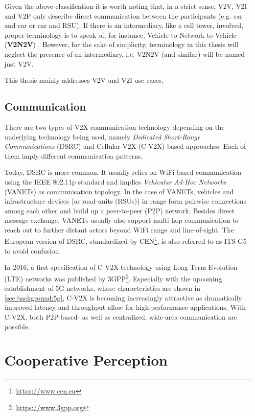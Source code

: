 Given the above classification it is worth noting that, in a strict sense, V2V, V2I and V2P only describe direct communication between the participants (e.g. car and car or car and RSU). If there is an intermediary, like a cell tower, involved, proper terminology is to speak of, for instance, Vehicle-to-Network-to-Vehicle (\textbf{V2N2V}) \cite{5GAutomotiveAssociation2019}. However, for the sake of simplicity, terminology in this thesis will neglect the presence of an intermediary, i.e. V2N2V (and similar) will be named just V2V. 
\par
\bigskip

This thesis mainly addresses V2V and V2I use cases.

\subsection{Communication}
\label{subsec:background:communication}
There are two types of V2X communication technology depending on the underlying technology being used, namely \textit{Dedicated Short-Range Communications} (DSRC) and Cellular-V2X (C-V2X)-based approaches. Each of them imply different communication patterns.

Today, DSRC is more common. It usually relies on WiFi-based communication using the IEEE 802.11p standard and implies \textit{Vehicular Ad-Hoc Networks} (VANETs) as communication topology. In the case of VANETs, vehicles and infrastructure devices (or road-units (RSUs)) in range form pairwise connections among each other and build up a peer-to-peer (P2P) network. Besides direct message exchange, VANETs usually also support multi-hop communication to reach out to further distant actors beyond WiFi range and line-of-sight. The European version of DSRC, standardized by CEN\footnote{\url{https://www.cen.eu}}, is also referred to as ITS-G5 to avoid confusion. 

In 2016, a first specification of C-V2X technology using Long Term Evolution (LTE) networks was published by 3GPP\footnote{\url{https://www.3gpp.org}}. Especially with the upcoming establishment of 5G networks, whose characteristics are shown in \cref{sec:background:5g}, C-V2X is becoming increasingly attractive as dramatically improved latency and throughput allow for high-performance applications. With C-V2X, both P2P-based- as well as centralized, wide-area communication are possible. 

\section{Cooperative Perception}
\label{sec:background:cooperative_perception}

